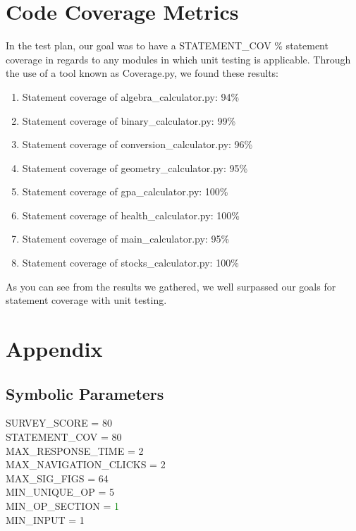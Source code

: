 \documentclass[12pt, titlepage]{article}
\begin{document}
\section{Code Coverage Metrics}
In the test plan, our goal was to have a STATEMENT\_COV \% statement coverage in regards to any modules in which unit testing is applicable. Through the use of a tool known as Coverage.py, we found these results:
\begin{enumerate}
    \item Statement coverage of algebra\_calculator.py: 94\%
    \item Statement coverage of binary\_calculator.py: 99\%
    \item Statement coverage of conversion\_calculator.py: 96\%
    \item Statement coverage of geometry\_calculator.py: 95\%
    \item Statement coverage of gpa\_calculator.py: 100\%
    \item Statement coverage of health\_calculator.py: 100\%
    \item Statement coverage of main\_calculator.py: 95\%
    \item Statement coverage of stocks\_calculator.py: 100\%
\end{enumerate}

As you can see from the results we gathered, we well surpassed our goals for statement coverage with unit testing.

\section{Appendix}


\subsection{Symbolic Parameters}
\label{sec:sp}

SURVEY\_SCORE = 80\\
STATEMENT\_COV = 80\\
MAX\_RESPONSE\_TIME = 2\\
MAX\_NAVIGATION\_CLICKS = 2\\
MAX\_SIG\_FIGS = 64\\
MIN\_UNIQUE\_OP = 5\\
MIN\_OP\_SECTION = \textcolor{Green}{1}\\
MIN\_INPUT = 1\\
\end{document}
